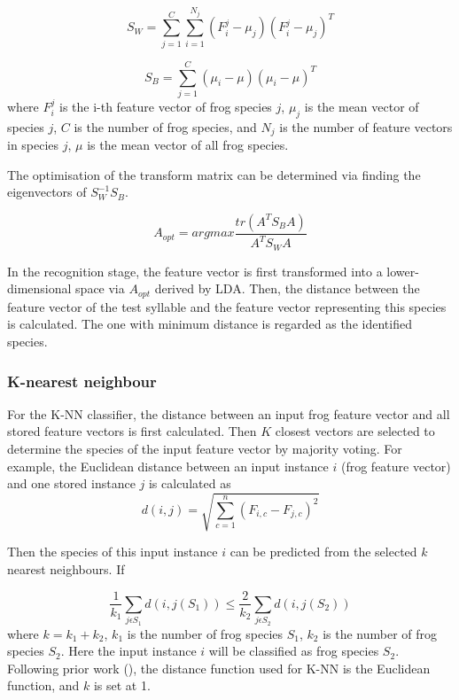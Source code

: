 \begin{equation}
S_{W}=\sum_{j=1}^{C}\sum_{i=1}^{N_{j}}(F_{i}^{j}-\mu_{j})(F_{i}^{j}-\mu_{j})^{T}
\end{equation}

\begin{equation}
S_{B}=\sum_{j=1}^{C}(\mu_{i}-\mu)(\mu_{i}-\mu)^{T}
\end{equation}
where $F_{i}^{j}$ is the i-th feature vector of frog species $j$, $\mu_{j}$ is the mean vector of species $j$, $C$ is the number of frog species, and $N_{j}$ is the number of feature vectors in species $j$, $\mu$ is the mean vector of all frog species.

The optimisation of the transform matrix can be determined via finding the eigenvectors of $S_{W}^{-1}S_{B}$.

\begin{equation}
A_{opt}= argmax \frac{tr(A^{T}S_{B}A)}{A^{T}S_{W}A}
\end{equation}

In the recognition stage, the feature vector is first transformed into a lower-dimensional space via $A_{opt}$ derived by LDA. Then, the distance between the feature vector of the test syllable and the feature vector representing this species is calculated. The one with minimum distance is regarded as the identified species.

\subsubsection{K-nearest neighbour}
For the K-NN classifier, the distance between an input frog feature vector and all stored feature vectors is first calculated. Then $K$ closest vectors are selected to determine the species of the input feature vector by majority voting. For example, the Euclidean distance between an input instance $i$ (frog feature vector) and one stored instance $j$ is calculated as 
\begin{equation}
d(i,j)=\sqrt{\sum_{c=1}^{n}(F_{i,c} - F_{j,c})^{2}}
\end{equation}

\noindent Then the species of this input instance $i$ can be predicted from the selected $k$ nearest neighbours. If 

\begin{equation}
\frac{1}{k_{1}}\sum_{j\epsilon S_{1}}d(i,j(S_{1})) \leq \frac{2}{k_{2}}\sum_{j\epsilon S_{2}}d(i,j(S_{2}))
\end{equation}
where $k = k_{1}+k_{2}$, $k_{1}$ is the number of frog species $S_{1}$, $k_{2}$ is the number of frog species $S_{2}$. Here the input instance $i$ will be classified as frog species $S_{2}$. Following prior work (\citep{han2011acoustic, Xie1504:Acoustic}), the distance function used for K-NN is the Euclidean function, and $k$ is set at 1.


